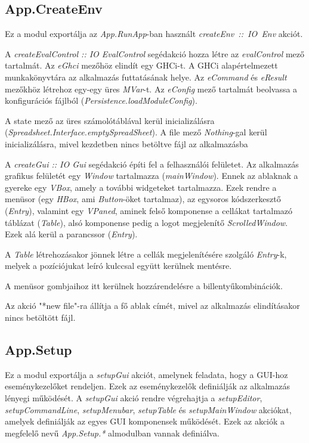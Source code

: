 \subsection{App.CreateEnv}

Ez a modul exportálja az \textit{App.RunApp}-ban használt \mbox{\textit{createEnv :: IO Env}} akciót.

A \textit{createEvalControl :: IO EvalControl} segédakció hozza létre az \textit{evalControl} mező tartalmát. Az \textit{eGhci} mezőhöz elindít egy GHCi-t. A GHCi alapértelmezett munkakönyvtára az alkalmazás futtatásának helye. Az \textit{eCommand} és \textit{eResult} mezőkhöz létrehoz egy-egy üres \textit{MVar}-t. Az \textit{eConfig} mező tartalmát beolvassa a konfigurációs fájlból (\textit{Persistence.loadModuleConfig}).

A state mező az üres számolótáblával kerül inicializálásra (\textit{Spreadsheet.Interface.emptySpreadSheet}). A file mező \textit{Nothing}-gal kerül inicializálásra, mivel kezdetben nincs betöltve fájl az alkalmazásba

A \textit{createGui :: IO Gui} segédakció építi fel a felhasználói felületet. Az alkalmazás grafikus felületét egy \textit{Window} tartalmazza (\textit{mainWindow}). Ennek az ablaknak a gyereke egy \textit{VBox}, amely a további widgeteket tartalmazza.   Ezek rendre a menüsor (egy \textit{HBox}, ami \textit{Button}-öket tartalmaz),  az egysoros kódszerkesztő (\textit{Entry}), valamint egy \textit{VPaned}, aminek felső komponense a cellákat tartalmazó táblázat (\textit{Table}), alsó komponense pedig a logot megjelenítő \textit{ScrolledWindow}. Ezek alá kerül a parancssor (\textit{Entry}).

A \textit{Table} létrehozásakor jönnek létre a cellák megjelenítésére szolgáló \textit{Entry}-k, melyek a pozíciójukat leíró kulccsal együtt kerülnek mentésre.

A menüsor gombjaihoz itt kerülnek hozzárendelésre a billentyűkombinációk.

Az akció "*new file"-ra állítja a fő ablak címét, mivel az alkalmazás elindításakor nincs betöltött fájl.

\subsection{App.Setup}

Ez a modul exportálja a \textit{setupGui} akciót, amelynek feladata, hogy a GUI-hoz eseménykezelőket rendeljen. Ezek az eseménykezelők definiálják az alkalmazás lényegi működését. A \textit{setupGui} akció rendre végrehajtja a \textit{setupEditor}, \textit{setupCommandLine}, \textit{setupMenubar}, \textit{setupTable} és \textit{setupMainWindow} akciókat, amelyek definiálják az egyes GUI komponensek működését. Ezek az akciók a megfelelő nevű \textit{App.Setup.*} almodulban vannak definiálva.

